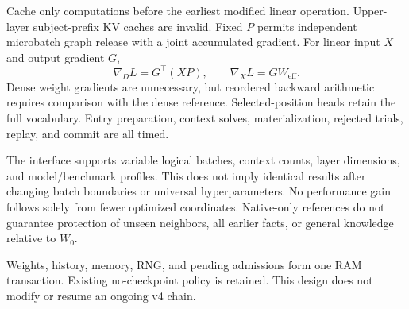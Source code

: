\documentclass[11pt]{article}
\begin{document}
Cache only computations before the earliest modified linear operation.
Upper-layer subject-prefix KV caches are invalid. Fixed $P$ permits
independent microbatch graph release with a joint accumulated gradient.
For linear input $X$ and output gradient $G$,
\[
\nabla_D L=G^\top(XP),\qquad \nabla_X L=G W_{\mathrm{eff}}.
\]
Dense weight gradients are unnecessary, but reordered backward arithmetic
requires comparison with the dense reference. Selected-position heads
retain the full vocabulary. Entry preparation, context solves,
materialization, rejected trials, replay, and commit are all timed.

The interface supports variable logical batches, context counts, layer
dimensions, and model/benchmark profiles. This does not imply identical
results after changing batch boundaries or universal hyperparameters.
No performance gain follows solely from fewer optimized coordinates.
Native-only references do not guarantee protection of unseen neighbors,
all earlier facts, or general knowledge relative to $W_0$.

Weights, history, memory, RNG, and pending admissions form one RAM
transaction. Existing no-checkpoint policy is retained. This design
does not modify or resume an ongoing v4 chain.
\end{document}
